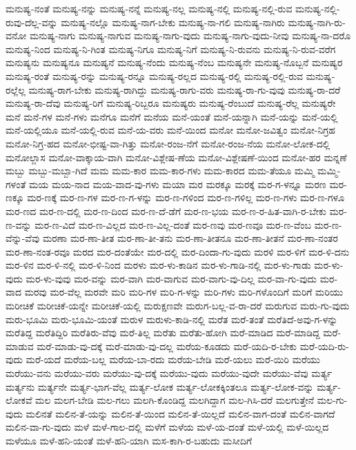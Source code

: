 {ಮನುಷ್ಯ-ನಂತೆ
ಮನುಷ್ಯ-ನನ್ನು
ಮನುಷ್ಯ-ನನ್ನೆ
ಮನುಷ್ಯ-ನಲ್ಲ
ಮನುಷ್ಯ-ನಲ್ಲಿ
ಮನುಷ್ಯ-ನಲ್ಲಿ-ರುವ
ಮನುಷ್ಯ-ನಲ್ಲಿ-ರುವು-ದೆಲ್ಲ-ವನ್ನು
ಮನುಷ್ಯ-ನಲ್ಲೊ
ಮನುಷ್ಯ-ನಾಗ-ಬೇಕು
ಮನುಷ್ಯ-ನಾ-ಗಲಿ
ಮನುಷ್ಯ-ನಾಗಿರು
ಮನುಷ್ಯ-ನಾಗಿ-ರು-ವನೋ
ಮನುಷ್ಯ-ನಾಗು
ಮನುಷ್ಯ-ನಾಗುವ
ಮನುಷ್ಯ-ನಾಗು-ವುದು
ಮನುಷ್ಯ-ನಾಗು-ವುದು-ನೀವು
ಮನುಷ್ಯ-ನಾ-ದರೊ
ಮನುಷ್ಯ-ನಿಂದ
ಮನುಷ್ಯ-ನಿ-ಗಿಂತ
ಮನುಷ್ಯ-ನಿಗೂ
ಮನುಷ್ಯ-ನಿಗೆ
ಮನುಷ್ಯ-ನಿ-ರುವನು
ಮನುಷ್ಯ-ನಿ-ರುವ-ವರೆಗ
ಮನುಷ್ಯನು
ಮನುಷ್ಯನೂ
ಮನುಷ್ಯನೆ
ಮನುಷ್ಯ-ನೆಂದು
ಮನುಷ್ಯ-ನೆಂಬ
ಮನುಷ್ಯನೇ
ಮನುಷ್ಯ-ನೊಬ್ಬನೆ
ಮನುಷ್ಯರ
ಮನುಷ್ಯ-ರಂತೆ
ಮನುಷ್ಯ-ರನ್ನು
ಮನುಷ್ಯ-ರನ್ನೂ
ಮನುಷ್ಯ-ರಲ್ಲದ
ಮನುಷ್ಯ-ರಲ್ಲಿ
ಮನುಷ್ಯ-ರಲ್ಲಿ-ರುವ
ಮನುಷ್ಯ-ರಲ್ಲೆಲ್ಲ
ಮನುಷ್ಯ-ರಾಗ-ಬೇಕು
ಮನುಷ್ಯ-ರಾಗಿದ್ದು
ಮನುಷ್ಯ-ರಾಗು-ವರು
ಮನುಷ್ಯ-ರಾ-ಗು-ವುವು
ಮನುಷ್ಯ-ರಾ-ದರೆ
ಮನುಷ್ಯ-ರಾ-ದೆವು
ಮನುಷ್ಯ-ರಿಗೆ
ಮನುಷ್ಯ-ರಿಬ್ಬರೂ
ಮನುಷ್ಯರು
ಮನುಷ್ಯ-ರೆಂಬುದೆ
ಮನುಷ್ಯ-ರೆಲ್ಲ
ಮನುಷ್ಯರೇ
ಮನೆ
ಮನೆ-ಗಳ
ಮನೆ-ಗಳು
ಮನೆಗೂ
ಮನೆಗೆ
ಮನೆಯ
ಮನೆ-ಯಂತೆ
ಮನೆ-ಯನ್ನಾಗಿ
ಮನೆ-ಯನ್ನು
ಮನೆ-ಯಲ್ಲಿ
ಮನೆ-ಯಲ್ಲಿಯೂ
ಮನೆ-ಯಲ್ಲಿ-ರುವ
ಮನೆ-ಯ-ವರು
ಮನೆ-ಯಿಂದ
ಮನೋ
ಮನೋ-ಜವಿತ್ವಂ
ಮನೋ-ನಿಗ್ರಹ
ಮನೋ-ನಿಗ್ರ-ಹದ
ಮನೋ-ಭೀಷ್ಟ-ವಾ-ಗಿತ್ತು
ಮನೋ-ರಂಜ-ನೆಗೆ
ಮನೋ-ರಂಜ-ನೆಯ
ಮನೋ-ಲೋಕ-ದಲ್ಲಿ
ಮನೋಲ್ಲಾಸ
ಮನೋ-ವಾಕ್ಕಾಯ-ವಾಗಿ
ಮನೋ-ವಿಶ್ಲೇಷ-ಣೆಯ
ಮನೋ-ವಿಶ್ಲೇಷಣೆ-ಯಿಂದ
ಮನೋ-ಹರ
ಮನ್ನಣೆ
ಮಬ್ಬು
ಮಬ್ಬು-ಮಬ್ಬಾ-ಗಿದೆ
ಮಮ
ಮಮ-ಕಾರ
ಮಮ-ಕಾರ-ಗಳು
ಮಮ-ಕಾರದ
ಮಮ-ತೆಯೂ
ಮಮ್ಮಿ
ಮಮ್ಮಿ-ಗಳಂತೆ
ಮಯ
ಮಯ-ನಾದ
ಮಯ-ವಾದ-ವು-ಗಳು
ಮಯಾ
ಮರ
ಮರಕ್ಕೂ
ಮರಕ್ಕೆ
ಮರ-ಗ-ಳನ್ನೂ
ಮರಣ
ಮರ-ಣಕ್ಕೂ
ಮರ-ಣಕ್ಕೆ
ಮರ-ಣ-ಗಳ
ಮರ-ಣ-ಗ-ಳನ್ನು
ಮರ-ಣ-ಗಳಿಂದ
ಮರ-ಣ-ಗಳಿಲ್ಲ
ಮರ-ಣ-ಗಳು
ಮರ-ಣ-ಗಳೂ
ಮರ-ಣದ
ಮರ-ಣ-ದಲ್ಲಿ
ಮರ-ಣ-ದಿಂದ
ಮರ-ಣ-ದೆ-ಡೆಗೆ
ಮರ-ಣ-ಭಯ
ಮರ-ಣ-ರ-ಹಿತ-ವಾಗಿ-ರ-ಬೇಕು
ಮರ-ಣ-ವನ್ನು
ಮರ-ಣ-ವಿದೆ
ಮರ-ಣ-ವಿಲ್ಲದ
ಮರ-ಣ-ವಿಲ್ಲ-ದಂತೆ
ಮರ-ಣವು
ಮರ-ಣವೂ
ಮರ-ಣ-ವೆಂಬ
ಮರ-ಣ-ವೆನ್ನು-ವೆವು
ಮರಣಾ
ಮರ-ಣಾ-ತೀತ
ಮರ-ಣಾ-ತೀ-ತನು
ಮರ-ಣಾ-ತೀತನೂ
ಮರ-ಣಾ-ತೀತನೆ
ಮರ-ಣಾ-ನಂತರ
ಮರ-ಣಾ-ನಂತ-ರವೂ
ಮರದ
ಮರ-ದಂತೆಯೇ
ಮರ-ದಲ್ಲಿ
ಮರ-ದಿಂದಾ-ಗು-ವುದು
ಮರಳಿ
ಮರ-ಳಿಗೆ
ಮರ-ಳಿ-ದನು
ಮರ-ಳಿನ
ಮರ-ಳಿ-ನಲ್ಲಿ
ಮರ-ಳಿ-ನಿಂದ
ಮರಳು
ಮರ-ಳು-ಕಾಡಿನ
ಮರ-ಳು-ಗಾಡಿ-ನಲ್ಲಿ
ಮರ-ಳು-ಗಾಡು
ಮರ-ಳು-ವುದು
ಮರ-ಳು-ವುವು
ಮರ-ವನ್ನು
ಮರ-ವಾಗಿ
ಮರ-ವಾಗುವ
ಮರ-ವಾಗು-ವು-ದಿಲ್ಲ
ಮರ-ವಾ-ಗು-ವುದು
ಮರ-ವಾದ
ಮರವು
ಮರ-ವೆಲ್ಲ
ಮರವೇ
ಮರಿ
ಮರಿ-ಗಳ
ಮರಿ-ಗ-ಳನ್ನು
ಮರಿ-ಗಳು
ಮರಿ-ಗಳೊಂದಿಗೆ
ಮರಿಗೆ
ಮರಿಯು
ಮರೀಚಿಕೆ
ಮರೀಚಿಕೆ-ಯನ್ನೇ
ಮರೀಚಿಕೆ-ಯಲ್ಲಿ
ಮರುಕ್ಷಣವೇ
ಮರುಗ-ಬಲ್ಲ-ವ-ರಾ-ದರೆ
ಮರುಗುವ
ಮರು-ಗು-ವುದು
ಮರು-ಭೂಮಿ
ಮರು-ಭೂಮಿ-ಯಂತೆ
ಮರುಳ
ಮರುಳು-ಕಾಡಿ-ನಲ್ಲಿ
ಮರೆತ
ಮರೆ-ತಂತೆ
ಮರೆತಿದೆ-ಅವು-ಗ-ಳನ್ನು
ಮರೆತಿದ್ದ
ಮರೆತಿದ್ದಿರಿ
ಮರೆತಿರು-ವೆವು
ಮರೆ-ತಿಲ್ಲ
ಮರೆತು
ಮರೆತು-ಹೋಗಿ
ಮರೆ-ಮಾಡಿದ
ಮರೆ-ಮಾಡಿದ್ದ
ಮರೆ-ಮಾಡುವ
ಮರೆ-ಮಾಡು-ವು-ದಕ್ಕೆ
ಮರೆ-ಮಾಡು-ವು-ದಲ್ಲ
ಮರೆಯ-ಕೂಡದು
ಮರೆ-ಯದಿ-ರ-ಬೇಕು
ಮರೆ-ಯದಿ-ರು-ವುದು
ಮರೆ-ಯದೆ
ಮರೆಯ-ಬಲ್ಲ
ಮರೆಯ-ಬಾ-ರದು
ಮರೆಯ-ಬೇಡಿ
ಮರೆ-ಯಲು
ಮರೆ-ಯಿರಿ
ಮರೆಯು
ಮರೆಯು-ವನು
ಮರೆಯು-ವರು
ಮರೆಯು-ವು-ದಕ್ಕೆ
ಮರೆಯು-ವುದು
ಮರೆಯು-ವುದೇ
ಮರೆಯು-ವೆವು
ಮರ್ತ್ಯ
ಮರ್ತ್ಯನು
ಮರ್ತ್ಯನೇ
ಮರ್ತ್ಯ-ಭಾಗ-ವೆಲ್ಲ
ಮರ್ತ್ಯ-ಲೋಕ
ಮರ್ತ್ಯ-ಲೋಕಕ್ಕಿಂತಲೂ
ಮರ್ತ್ಯ-ಲೋಕ-ವನ್ನು
ಮರ್ತ್ಯ-ಲೋಕವೆ
ಮಲ
ಮಲಗ-ಬೇಡಿ
ಮಲ-ಗಲು
ಮಲಗಿ-ಕೊಂಡಿದ್ದ
ಮಲಗಿದ್ದಾಗ
ಮಲ-ಗಿಸಿ-ದರೆ
ಮಲಗುತ್ತೇನೆ
ಮಲ-ಗು-ವುದು
ಮಲಿನತೆ
ಮಲಿನ-ತೆ-ಯನ್ನು
ಮಲಿನ-ತೆ-ಯಿಂದ
ಮಲಿನ-ತೆ-ಯಿಲ್ಲದೆ
ಮಲಿನ-ವಾಗ-ದಂತೆ
ಮಲಿನ-ವಾಗದೆ
ಮಲಿನ-ವಾ-ಗು-ವುದು
ಮಳೆ
ಮಳೆ-ಗಾಲ-ದಲ್ಲಿ
ಮಳೆಗೆ
ಮಳೆಯ
ಮಳೆ-ಯ-ದಂತೆ
ಮಳೆ-ಯಲ್ಲಿ
ಮಳೆ-ಯಿಲ್ಲದ
ಮಳೆಯೂ
ಮಳೆ-ಹನಿ-ಯಂತೆ
ಮಳೆ-ಹನಿ-ಯಾಗಿ
ಮಸ-ಕಾಗಿ-ರ-ಬಹುದು
ಮಸೀದಿಗೆ
}
